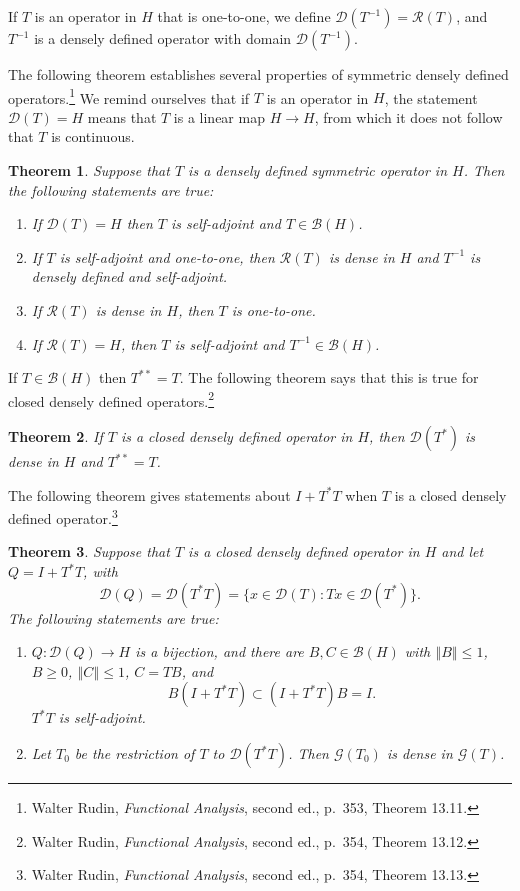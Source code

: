 \documentclass{article}
\newcommand{\norm}[1]{\left\Vert #1 \right\Vert}
\newtheorem{theorem}{Theorem}
\theoremstyle{definition}
\begin{document}
If $T$ is an operator in $H$ that is one-to-one, we define $\mathscr{D}(T^{-1})=\mathscr{R}(T)$, and
$T^{-1}$ is a densely defined operator with domain $\mathscr{D}(T^{-1})$. 


The following theorem establishes several properties of symmetric densely defined operators.\footnote{Walter
Rudin, {\em Functional Analysis}, second ed., p.~353, Theorem 13.11.} We remind ourselves that if $T$ is an operator in $H$,
the statement $\mathscr{D}(T)=H$ means that $T$ is a linear map $H \to H$, from which it does not follow that $T$ is continuous.

\begin{theorem}
Suppose that $T$ is a densely defined symmetric operator in $H$. Then the following statements are true:
\begin{enumerate}
\item If $\mathscr{D}(T)=H$ then $T$ is self-adjoint and $T \in \mathscr{B}(H)$.
\item If $T$ is self-adjoint and one-to-one, then $\mathscr{R}(T)$ is dense in $H$ and
$T^{-1}$ is densely defined and self-adjoint.
\item If $\mathscr{R}(T)$ is dense in $H$, then $T$ is one-to-one.
\item If $\mathscr{R}(T)=H$, then $T$ is self-adjoint and $T^{-1} \in \mathscr{B}(H)$.
\end{enumerate}
\end{theorem}

If $T \in \mathscr{B}(H)$ then $T^{**}=T$. The following theorem says that this is true for
closed densely defined operators.\footnote{Walter
Rudin, {\em Functional Analysis}, second ed., p.~354, Theorem 13.12.}

\begin{theorem}
If $T$ is a closed densely defined operator in $H$, then $\mathscr{D}(T^*)$ is dense in $H$ and $T^{**}=T$.
\end{theorem}


The following theorem gives statements about $I+T^*T$ when $T$ is a closed densely
defined operator.\footnote{Walter
Rudin, {\em Functional Analysis}, second ed., p.~354, Theorem 13.13.}

\begin{theorem}
Suppose that $T$ is a closed densely defined operator in $H$ and let $Q=I+T^*T$, with
\[
\mathscr{D}(Q) = \mathscr{D}(T^*T) = \{x \in \mathscr{D}(T): Tx \in \mathscr{D}(T^*)\}.
\]
The following statements are true:
\begin{enumerate}
\item $Q:\mathscr{D}(Q) \to H$ is a bijection, and there are $B, C \in \mathscr{B}(H)$ with
$\norm{B} \leq 1$, $B \geq 0$, $\norm{C} \leq 1$, $C=TB$, and
\[
B(I+T^*T) \subset (I+T^*T)B=I.
\]
$T^*T$ is self-adjoint.
\item Let $T_0$ be the restriction of $T$ to $\mathscr{D}(T^*T)$. Then $\mathscr{G}(T_0)$ is dense in
$\mathscr{G}(T)$.
\end{enumerate}
\end{theorem}
\end{document}
